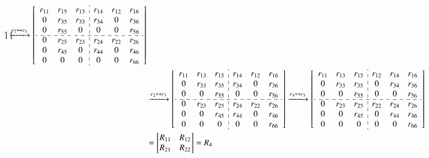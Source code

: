 \documentclass[3p]{elsarticle}
\numberwithin{equation}{section}
\begin{document}
\begin{align*}
\begin{bmatrix}
\end{bmatrix}
\xrightarrow{c_{2} \leftrightarrow c_{5}}
\begin{bmatrix}
\begin{array}{ccc:ccc}
 r_{11} & r_{15} & r_{13} & r_{14}  & r_{12} & r_{16}\\
 0      & r_{35} & r_{33} & r_{34}  & 0      & r_{36}\\
 0      & r_{55} & 0      & 0       & 0      & r_{56}\\
 \cdashline{1-6}
 0      & r_{25} & r_{23} & r_{24}  & r_{22} & r_{26}\\
 0      & r_{45} & 0      & r_{44}  & 0      & r_{46}\\
 0      & 0      & 0      & 0       & 0      & r_{66}\\
\end{array}
\end{bmatrix} \\
& \xrightarrow{c_{2} \leftrightarrow c_{3}}
\begin{bmatrix}
\begin{array}{ccc:ccc}
 r_{11} & r_{13} & r_{15} & r_{14}  & r_{12} & r_{16}\\
 0      & r_{33} & r_{35} & r_{34}  & 0      & r_{36}\\
 0      & 0      & r_{55} & 0       & 0      & r_{56}\\
 \cdashline{1-6}
 0      & r_{23} & r_{25} & r_{24}  & r_{22} & r_{26}\\
 0      & 0      & r_{45} & r_{44}  & 0      & r_{46}\\
 0      & 0      & 0      & 0       & 0      & r_{66}\\
\end{array}
\end{bmatrix}
\xrightarrow{c_{4} \leftrightarrow c_{5}}
\begin{bmatrix}
\begin{array}{ccc:ccc}
 r_{11} & r_{13} & r_{15} & r_{12} & r_{14} & r_{16}\\
 0      & r_{33} & r_{35} & 0      & r_{34} & r_{36}\\
 0      & 0      & r_{55} & 0      & 0      & r_{56}\\
 \cdashline{1-6}
0 & r_{23} & r_{25} & r_{22} & r_{24} & r_{26}\\
 0      & 0 & r_{45} & 0      & r_{44} & r_{46}\\
 0      & 0      & 0 & 0      & 0      & r_{66}\\
\end{array}
\end{bmatrix} \\
&=\begin{bmatrix}
    R_{11} & R_{12}\\R_{21} & R_{22}
\end{bmatrix} = R_4
\end{align*}
\end{document}

